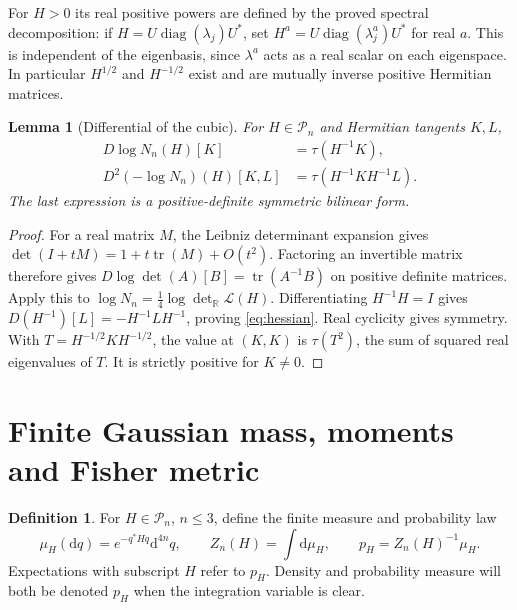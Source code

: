 \documentclass[11pt,a4paper]{article}
\numberwithin{equation}{section}
\newtheorem{lemma}[theorem]{Lemma}
\theoremstyle{definition}
\newtheorem{definition}[theorem]{Definition}
\theoremstyle{remark}
\newcommand{\RR}{\mathbb R}
\newcommand{\PP}{\mathcal P}
\newcommand{\tr}{\operatorname{tr}}
\newcommand{\diag}{\operatorname{diag}}
\newcommand{\rtr}{\tau}
\begin{document}
For $H>0$ its real positive powers are defined by the proved spectral
decomposition: if $H=U\diag(\lambda_j)U^*$, set
$H^a=U\diag(\lambda_j^a)U^*$ for real $a$.
This is independent of the eigenbasis, since $\lambda^a$ acts as a
real scalar on each eigenspace. In particular $H^{1/2}$ and $H^{-1/2}$
exist and are mutually inverse positive Hermitian matrices.

\begin{lemma}[Differential of the cubic]\label{lem:differential}
For $H\in\PP_n$ and Hermitian tangents $K,L$,
\begin{align}
D\log N_n(H)[K]&=\rtr(H^{-1}K),\label{eq:dlog}\\
D^2(-\log N_n)(H)[K,L]&=\rtr(H^{-1}KH^{-1}L).\label{eq:hessian}
\end{align}
The last expression is a positive-definite symmetric bilinear form.
\end{lemma}
\begin{proof}
For a real matrix $M$, the Leibniz determinant expansion gives
$\det(I+tM)=1+t\tr(M)+O(t^2)$. Factoring an invertible matrix
therefore gives $D\log\det(A)[B]=\tr(A^{-1}B)$ on positive definite
matrices. Apply this to $\log N_n=\tfrac14\log\det_{\RR}\mathscr L(H)$.
Differentiating $H^{-1}H=I$ gives
$D(H^{-1})[L]=-H^{-1}LH^{-1}$, proving \eqref{eq:hessian}.
Real cyclicity gives symmetry. With $T=H^{-1/2}KH^{-1/2}$,
the value at $(K,K)$ is $\rtr(T^2)$, the sum of squared real eigenvalues
of $T$. It is strictly positive for $K\ne0$.
\end{proof}

\section{Finite Gaussian mass, moments and Fisher metric}\label{sec:gaussian}

\begin{definition}
For $H\in\PP_n$, $n\le3$, define the finite measure and probability law
\begin{equation}\label{eq:family}
\mu_H(\mathrm dq)=e^{-q^*Hq}\mathrm d^{4n}q,
\qquad Z_n(H)=\int\mathrm d\mu_H,
\qquad p_H=Z_n(H)^{-1}\mu_H.
\end{equation}
Expectations with subscript $H$ refer to $p_H$. Density and probability
measure will both be denoted $p_H$ when the integration variable is clear.
\end{definition}
\end{document}
